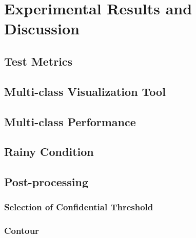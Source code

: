 
\chapter{Experimental Results and Discussion}
\begin{spacing}{1.5}
\setlength{\parskip}{0.3in}

\section{Test Metrics}

\section{Multi-class Visualization Tool}

\section{Multi-class Performance}

\section{Rainy Condition}

\section{Post-processing}

\subsection{Selection of Confidential Threshold}

\subsection{Contour}


\end{spacing}
\newpage
